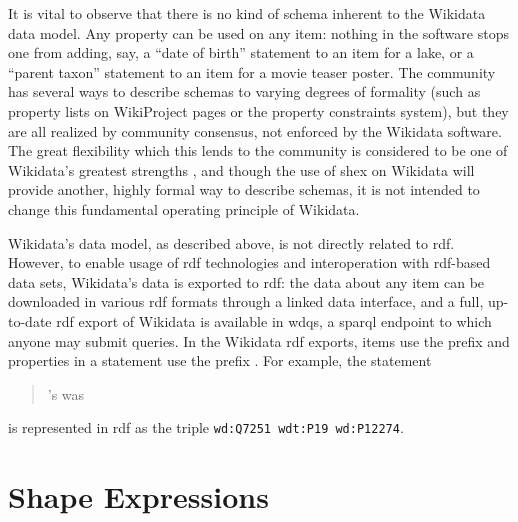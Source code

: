It is vital to observe that there is no kind of \gls{schema} inherent to the \gls{Wikidata} data model.
Any \gls{property} can be used on any \gls{item}:
nothing in the software stops one from adding, say,
a “date of birth” \gls{statement} to an \gls{item} for a lake,
or a “parent taxon” \gls{statement} to an \gls{item} for a movie teaser poster.
The community has several ways to describe \glspl{schema} to varying degrees of formality
(such as \gls{property} lists on WikiProject pages or the property constraints system),
but they are all realized by community consensus,
not enforced by the \gls{Wikidata} software.
The great flexibility which this lends to the community
is considered to be one of \gls{Wikidata}’s greatest strengths \cite{vrandecic-restricting-the-world},
and though the use of \gls{shex}
on \gls{Wikidata} will provide another,
highly formal way to describe \glspl{schema},
it is not intended to change this fundamental operating principle of \gls{Wikidata}. %

\gls{Wikidata}’s data model, as described above,
is not directly related to \gls{rdf}.
However, to enable usage of \gls{rdf} technologies and interoperation with \gls{rdf}-based data sets,
\gls{Wikidata}’s data is exported to \gls{rdf}:
the data about any \gls{item} can be downloaded in various \gls{rdf} formats through a linked data interface, %
and a full, up-to-date \gls{rdf} export of \gls{Wikidata} is available in \gls{wdqs},
a \gls{sparql} endpoint to which anyone may submit queries.
In the \gls{Wikidata} \gls{rdf} exports,
items use the prefix  and properties in a statement use the prefix .
For example, the statement
\begin{quotation}
  ’s  was 
\end{quotation}
is represented in \gls{rdf} as the \gls{triple} \lstinline[language=sparql]{wd:Q7251 wdt:P19 wd:P12274}.


\section{Shape Expressions}
\label{sec:Background:ShEx}

